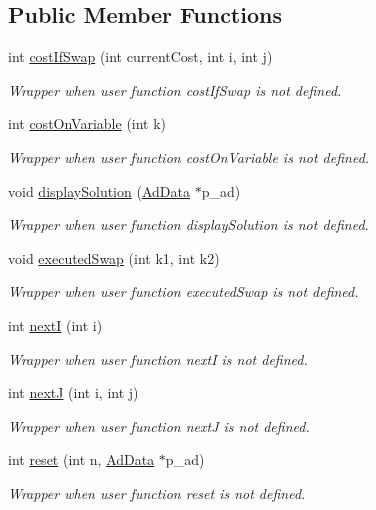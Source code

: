 \subsection*{\-Public \-Member \-Functions}
\begin{DoxyCompactItemize}
\item 
int \hyperlink{classBench_a5d88ce438e5ff9259f872bdcfe86621e}{cost\-If\-Swap} (int current\-Cost, int i, int j)
\begin{DoxyCompactList}\small\item\em \-Wrapper when user function cost\-If\-Swap is not defined. \end{DoxyCompactList}\item 
int \hyperlink{classBench_af27d153047259b80af7b556c0bfdadab}{cost\-On\-Variable} (int k)
\begin{DoxyCompactList}\small\item\em \-Wrapper when user function cost\-On\-Variable is not defined. \end{DoxyCompactList}\item 
void \hyperlink{classBench_a8f1d5b7a37082ec2f2bb15b9e3820c96}{display\-Solution} (\hyperlink{classAdData}{\-Ad\-Data} $\ast$p\-\_\-ad)
\begin{DoxyCompactList}\small\item\em \-Wrapper when user function display\-Solution is not defined. \end{DoxyCompactList}\item 
void \hyperlink{classBench_a0985e6c65a50742c898dd717dce2294c}{executed\-Swap} (int k1, int k2)
\begin{DoxyCompactList}\small\item\em \-Wrapper when user function executed\-Swap is not defined. \end{DoxyCompactList}\item 
int \hyperlink{classBench_a2ace948d46b3bcc7d76b2a4a32b427cd}{next\-I} (int i)
\begin{DoxyCompactList}\small\item\em \-Wrapper when user function next\-I is not defined. \end{DoxyCompactList}\item 
int \hyperlink{classBench_a5bc8976d21762350873d32e5f64a8d70}{next\-J} (int i, int j)
\begin{DoxyCompactList}\small\item\em \-Wrapper when user function next\-J is not defined. \end{DoxyCompactList}\item 
int \hyperlink{classBench_a0a317019a5065efe4bc37d1760379786}{reset} (int n, \hyperlink{classAdData}{\-Ad\-Data} $\ast$p\-\_\-ad)
\begin{DoxyCompactList}\small\item\em \-Wrapper when user function reset is not defined. \end{DoxyCompactList}\end{DoxyCompactItemize}
